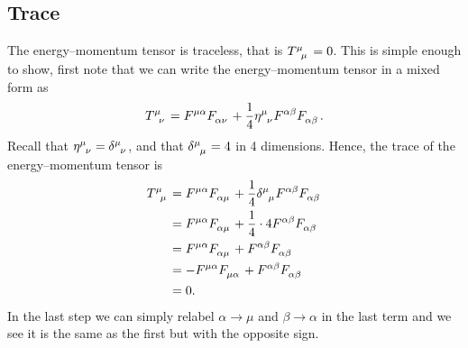 \subsection{Trace}
The energy--momentum tensor is traceless, that is \(\tensor{T}{^\mu_\mu} = 0\).
This is simple enough to show, first note that we can write the energy--momentum tensor in a mixed form as
\begin{equation}
    \tensor{T}{^\mu_\nu} = \tensor{F}{^{\mu\alpha}} \tensor{F}{_{\alpha\nu}} + \frac{1}{4}\tensor{\eta}{^\mu_\nu}\tensor{F}{^{\alpha\beta}}\tensor{F}{_{\alpha\beta}}.
\end{equation}
Recall that \(\tensor{\eta}{^\mu_\nu} = \tensor{\delta}{^\mu_\nu}\), and that \(\tensor{\delta}{^\mu_\mu} = 4\) in 4 dimensions.
Hence, the trace of the energy--momentum tensor is
\begin{align}
    \tensor{T}{^\mu_\mu} &= \tensor{F}{^{\mu\alpha}}\tensor{F}{_{\alpha\mu}} + \frac{1}{4}\tensor{\delta}{^\mu_\mu}\tensor{F}{^{\alpha\beta}}\tensor{F}{_{\alpha\beta}}\\
    &= \tensor{F}{^{\mu\alpha}}\tensor{F}{_{\alpha\mu}} + \frac{1}{4}\cdot 4 \tensor{F}{^{\alpha\beta}}\tensor{F}{_{\alpha\beta}}\\
    &= \tensor{F}{^{\mu\alpha}}\tensor{F}{_{\alpha\mu}} + \tensor{F}{^{\alpha\beta}}\tensor{F}{_{\alpha\beta}}\\
    &= -\tensor{F}{^{\mu\alpha}}\tensor{F}{_{\mu\alpha}} + \tensor{F}{^{\alpha\beta}}\tensor{F}{_{\alpha\beta}}\\
    &= 0.
\end{align}
In the last step we can simply relabel \(\alpha \to \mu\) and \(\beta \to \alpha\) in the last term and we see it is the same as the first but with the opposite sign.

